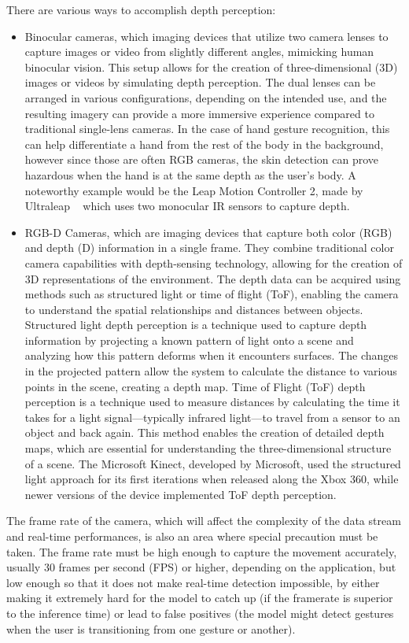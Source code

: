 \documentclass[12pt]{article}
\begin{document}
There are various ways to accomplish depth perception:
\begin{itemize}
  \item Binocular cameras, which imaging devices that utilize two camera lenses to capture images or video from slightly different angles, mimicking human binocular vision. This setup allows for the creation of three-dimensional (3D) images or videos by simulating depth perception. The dual lenses can be arranged in various configurations, depending on the intended use, and the resulting imagery can provide a more immersive experience compared to traditional single-lens cameras. In the case of hand gesture recognition, this can help differentiate a hand from the rest of the body in the background, however since those are often RGB cameras, the skin detection can prove hazardous when the hand is at the same depth as the user's body. A noteworthy example would be the Leap Motion Controller 2, made by Ultraleap ~\cite{LEAPMOTION} which uses two monocular IR sensors to capture depth.
  \item RGB-D Cameras, which are imaging devices that capture both color (RGB) and depth (D) information in a single frame. They combine traditional color camera capabilities with depth-sensing technology, allowing for the creation of 3D representations of the environment. The depth data can be acquired using methods such as structured light or time of flight (ToF), enabling the camera to understand the spatial relationships and distances between objects. Structured light depth perception is a technique used to capture depth information by projecting a known pattern of light onto a scene and analyzing how this pattern deforms when it encounters surfaces. The changes in the projected pattern allow the system to calculate the distance to various points in the scene, creating a depth map. Time of Flight (ToF) depth perception is a technique used to measure distances by calculating the time it takes for a light signal—typically infrared light—to travel from a sensor to an object and back again. This method enables the creation of detailed depth maps, which are essential for understanding the three-dimensional structure of a scene. The Microsoft Kinect, developed by Microsoft, used the structured light approach for its first iterations when released along the Xbox 360, while newer versions of the device implemented ToF depth perception.
\end{itemize}

The frame rate of the camera, which will affect the complexity of the data stream and real-time performances, is also an area where special precaution must be taken. The frame rate must be high enough to capture the movement accurately, usually 30 frames per second (FPS) or higher, depending on the application, but low enough so that it does not make real-time detection impossible, by either making it extremely hard for the model to catch up (if the framerate is superior to the inference time) or lead to false positives (the model might detect gestures when the user is transitioning from one gesture or another).
\end{document}
